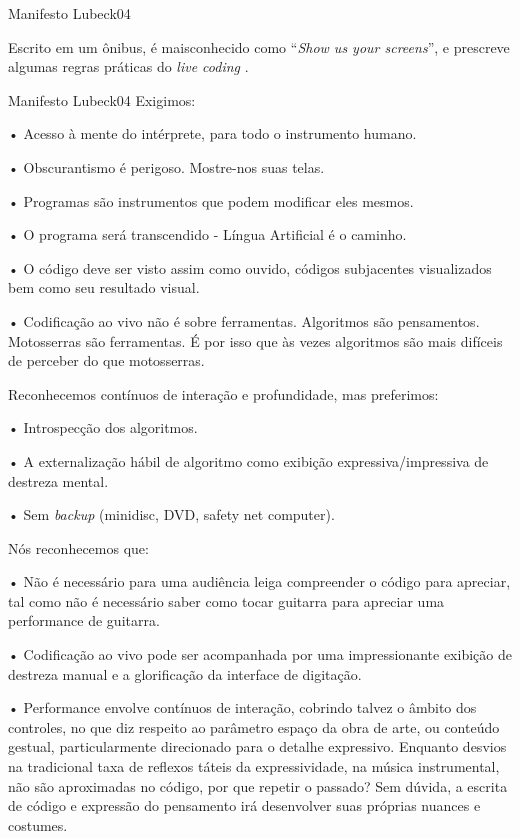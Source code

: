 \documentclass[aspectratio=169]{beamer}
\begin{document}
\begin{frame}{Manifesto Lubeck04}

Escrito em um ônibus, é maisconhecido como ``\emph{Show us your screens}'', e prescreve algumas regras práticas do \emph{live coding} \cite[p.~247]{ward_live_2004}. 
\end{frame}

\begin{frame}[allowframebreaks]{Manifesto Lubeck04}
Exigimos:

• Acesso à mente do intérprete, para todo o instrumento humano.

• Obscurantismo é perigoso. Mostre-nos suas telas.

• Programas são instrumentos que podem modificar eles mesmos.

• O programa será transcendido - Língua Artificial é o caminho.

• O código deve ser visto assim como ouvido, códigos subjacentes visualizados bem como seu resultado visual.

• Codificação ao vivo não é sobre ferramentas. Algoritmos são pensamentos. Motosserras são ferramentas. É por isso que às vezes algoritmos são mais difíceis de perceber do que motosserras.

Reconhecemos contínuos de interação e profundidade, mas preferimos:

• Introspecção dos algoritmos.

• A externalização hábil de algoritmo como exibição expressiva/impressiva de destreza mental.

• Sem \emph{backup} (minidisc, DVD, safety net computer).

Nós reconhecemos que:

• Não é necessário para uma audiência leiga compreender o código para apreciar, tal como não é necessário saber como tocar guitarra para apreciar uma performance de guitarra.

• Codificação ao vivo pode ser acompanhada por uma impressionante exibição de destreza manual e a glorificação da interface de digitação.

• Performance envolve contínuos de interação, cobrindo talvez o âmbito dos controles, no que diz respeito ao parâmetro espaço da obra de arte, ou conteúdo gestual, particularmente direcionado para o detalhe expressivo. Enquanto desvios na tradicional taxa de reflexos táteis da expressividade, na música instrumental, não são aproximadas no código, por que repetir o passado? Sem dúvida, a escrita de código e expressão do pensamento irá desenvolver suas próprias nuances e costumes. 
\end{frame}
\end{document}
